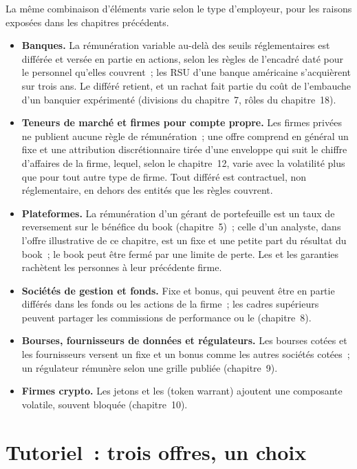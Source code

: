 La même combinaison d'éléments varie selon le type d'employeur, pour les raisons exposées dans les chapitres précédents.
\begin{itemize}
\item \textbf{Banques.} La rémunération variable au-delà des seuils réglementaires est différée et versée en partie en actions, selon les règles
de l'encadré daté pour le personnel qu'elles couvrent~; les RSU d'une banque américaine s'acquièrent sur trois ans. Le différé retient, et un
rachat fait partie du coût de l'embauche d'un banquier expérimenté (divisions du chapitre~7, rôles du chapitre~18).
\item \textbf{Teneurs de marché et firmes pour compte propre.} Les firmes privées ne publient aucune règle de rémunération~; une offre comprend en général
un fixe et une attribution discrétionnaire tirée d'une enveloppe qui suit le chiffre d'affaires de la firme, lequel, selon le chapitre~12, varie avec
la volatilité plus que pour tout autre type de firme. Tout différé est contractuel, non réglementaire, en dehors des entités que les règles couvrent.
\item \textbf{Plateformes.} La rémunération d'un gérant de portefeuille est un taux de reversement sur le bénéfice du book (chapitre~5)~; celle d'un
analyste, dans l'offre illustrative de ce chapitre, est un fixe et une petite part du résultat du book~; le book peut être fermé par une
limite de perte. Les  et les garanties rachètent les personnes à leur précédente firme.
\item \textbf{Sociétés de gestion et fonds.} Fixe et bonus, qui peuvent être en partie différés dans les fonds ou les actions de la firme~;
les cadres supérieurs peuvent partager les commissions de performance ou le  (chapitre~8).
\item \textbf{Bourses, fournisseurs de données et régulateurs.} Les bourses cotées et les fournisseurs versent un fixe et un bonus comme les autres
sociétés cotées~; un régulateur rémunère selon une grille publiée (chapitre~9).
\item \textbf{Firmes crypto.} Les jetons et les  (token warrant) ajoutent une composante volatile, souvent bloquée (chapitre~10).
\end{itemize}

\section{Tutoriel~: trois offres, un choix}\label{tut:in:how-pay-works:tut}

